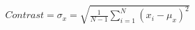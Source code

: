 \documentclass[preview]{standalone}
\begin{document}
\begin{align*}
Contrast = \sigma_x = \sqrt{\frac{1}{N-1}\sum_{i=1}^{N}(x_i - \mu_x)^2}
\end{align*}
\end{document}
